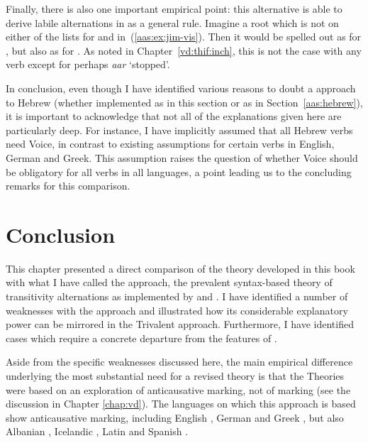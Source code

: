 \begin{exe}
\begin{xlist}
\begin{exe}
\begin{exe}
\begin{xlist}
\begin{exe}
\begin{exe}
\begin{exe}
\begin{exe}
\begin{exe}
\begin{xlist}
\begin{exe}
\begin{exe}
\begin{xlist}
\begin{exe}
\begin{xlist}
\begin{exe}
\begin{xlist}
\begin{exe}
\begin{xlist}
Finally, there is also one important empirical point: this alternative is able to derive labile alternations in {\tkal} as a general rule. Imagine a root  which is not on either of the lists for {\vds} and {\vzs} in~(\ref{aas:ex:jim-vis}). Then it would be spelled out as {\tkal} for {\vds}, but also as {\tkal} for {\vzs}. As noted in Chapter~\ref{vd:thif:inch}, this is not the case with any verb except for perhaps \emph{a{\ts}ar} `stopped'.

In conclusion, even though I have identified various reasons to doubt a  approach to Hebrew (whether implemented as in this section or as in Section~\ref{aas:hebrew}), it is important to acknowledge that not all of the explanations given here are particularly deep. For instance, I have implicitly assumed that all Hebrew verbs need Voice, in contrast to existing assumptions for certain verbs in English, German and Greek. This assumption raises the question of whether Voice should be obligatory for all verbs in all languages, a point leading us to the concluding remarks for this comparison.


\section{Conclusion} \label{aas:conc}
This chapter presented a direct comparison of the theory developed in this book with what I have called the  approach, the prevalent syntax-based theory of transitivity alternations as implemented by \cite{schaefer08,schaefer17oup} and \cite{layering15}. I have identified a number of weaknesses with the  approach and illustrated how its considerable explanatory power can be mirrored in the Trivalent approach. Furthermore, I have identified cases which require a concrete departure from the features of .

Aside from the specific weaknesses discussed here, the main empirical difference underlying the most substantial need for a revised theory is that the  Theories were based on an exploration of anticausative marking, not of  marking (see the discussion in Chapter \ref{chap:vd}). The languages on which this approach is based show anticausative marking, including English \citep{myler16mit}, German \citep{schaefer17oup} and Greek \citep{spathasetal15}, but also Albanian \citep{kallulli13}, Icelandic \citep{wood15springer}, Latin \citep{embick04,kastnerzu17} and Spanish \citep{schaefervivanco16}.


\end{xlist}
\end{exe}
\end{xlist}
\end{exe}
\end{xlist}
\end{exe}
\end{xlist}
\end{exe}
\end{exe}
\end{xlist}
\end{exe}
\end{exe}
\end{exe}
\end{exe}
\end{exe}
\end{xlist}
\end{exe}
\end{exe}
\end{xlist}
\end{exe}
